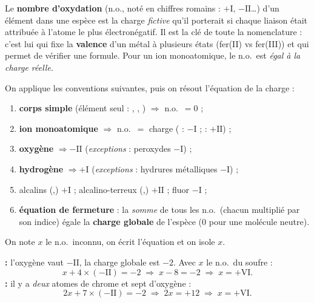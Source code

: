 \documentclass[11pt,a4paper]{article}
\begin{document}

\begin{cle}
Le \textbf{nombre d'oxydation} (n.o., noté en chiffres romains : $+\mathrm{I}$, $-\mathrm{II}$\ldots) d'un
élément dans une espèce est la charge \emph{fictive} qu'il porterait si chaque liaison était attribuée à
l'atome le plus électronégatif. Il est la clé de toute la nomenclature : c'est lui qui fixe la
\textbf{valence} d'un métal à plusieurs états (fer(II) vs fer(III)) et qui permet de vérifier une formule.
Pour un ion monoatomique, le n.o.\ est \emph{égal à la charge réelle}.
\end{cle}

\begin{methode}
On applique les conventions suivantes, puis on résout l'équation de la charge :
\begin{enumerate}[label=\arabic*.,leftmargin=2.0em,topsep=2pt,itemsep=1pt]
  \item \textbf{corps simple} (élément seul : , , ) $\Rightarrow$ n.o.\ $=0$ ;
  \item \textbf{ion monoatomique} $\Rightarrow$ n.o.\ $=$ charge ( : $-\mathrm{I}$ ;  : $+\mathrm{II}$) ;
  \item \textbf{oxygène} $\Rightarrow -\mathrm{II}$ \quad(\emph{exceptions} : peroxydes $-\mathrm{I}$) ;
  \item \textbf{hydrogène} $\Rightarrow +\mathrm{I}$ \quad(\emph{exceptions} : hydrures métalliques $-\mathrm{I}$) ;
  \item alcalins (,) $+\mathrm{I}$ ; alcalino-terreux (,) $+\mathrm{II}$ ; fluor $-\mathrm{I}$ ;
  \item \textbf{équation de fermeture} : la \emph{somme} de tous les n.o.\ (chacun multiplié par son indice)
        égale la \textbf{charge globale} de l'espèce (0 pour une molécule neutre).
\end{enumerate}
On note $x$ le n.o.\ inconnu, on écrit l'équation et on isole $x$.
\end{methode}

\begin{exemplebox}
\textbf{ :} l'oxygène vaut $-\mathrm{II}$, la charge globale est $-2$. Avec $x$ le n.o.\ du soufre :
\[ x + 4\times(-\mathrm{II}) = -2 \;\Rightarrow\; x - 8 = -2 \;\Rightarrow\; \boxed{x = +\mathrm{VI}}. \]
\textbf{ :} il y a \emph{deux} atomes de chrome et sept d'oxygène :
\[ 2x + 7\times(-\mathrm{II}) = -2 \;\Rightarrow\; 2x = +12 \;\Rightarrow\; \boxed{x = +\mathrm{VI}}. \]
\end{exemplebox}
\end{document}
